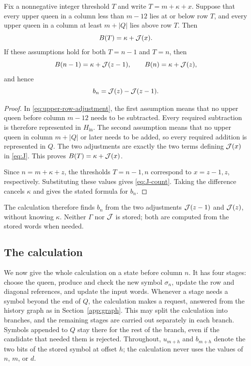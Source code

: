 \begin{proposition}\label{prop:upper-row-count}
Fix a nonnegative integer threshold $T$ and write
$T=m+\kappa+x$. Suppose that every upper queen in a column
less than $m-12$ lies at or below row $T$, and every upper
queen in a column at least $m+|Q|$ lies above row $T$. Then
\[
 B(T)=\kappa+\mathcal J(x).
\]
If these assumptions hold for both $T=n-1$ and $T=n$, then
\begin{equation}\label{eq:J-count}
 B(n-1)=\kappa+\mathcal J(z-1),\qquad B(n)=\kappa+\mathcal J(z),
\end{equation}
and hence
\[
 b_n=\mathcal J(z)-\mathcal J(z-1).
\]
\end{proposition}

\begin{proof}
In \eqref{eq:upper-row-adjustment}, the first assumption means
that no upper queen before column $m-12$ needs to be subtracted.
Every required subtraction is therefore represented in
$H_{\mathrm{in}}$. The second assumption means that no upper
queen in column $m+|Q|$ or later needs to be added, so every
required addition is represented in $Q$. The two adjustments
are exactly the two terms defining $\mathcal J(x)$ in \eqref{eq:J}.
This proves $B(T)=\kappa+\mathcal J(x)$.

Since $n=m+\kappa+z$, the thresholds $T=n-1,n$ correspond
to $x=z-1,z$, respectively. Substituting these values gives
\eqref{eq:J-count}. Taking the difference cancels $\kappa$
and gives the stated formula for $b_n$.
\end{proof}

The calculation therefore finds $b_n$ from the two adjustments
$\mathcal J(z-1)$ and $\mathcal J(z)$, without knowing $\kappa$. Neither $\Gamma$ nor
$\mathcal J$ is stored; both are computed from the stored words when needed.

\subsection{The calculation}\label{app:output}

We now give the whole calculation on a state before column $n$. It
has four stages: choose the queen, produce and check the new symbol
$\sigma_n$, update the row and diagonal references, and update the
input words. Whenever a stage needs a symbol beyond the end of $Q$,
the calculation makes a request, answered from the history graph as
in Section~\ref{app:graph}. This may split the calculation into
branches, and the remaining stages are carried out separately in
each branch. Symbols appended to $Q$ stay there for the rest of the
branch, even if the candidate that needed them is rejected.
Throughout, $u_{m+h}$ and $b_{m+h}$ denote the two bits of the stored
symbol at offset $h$; the calculation never uses the values of $n$,
$m$, or $d$.

